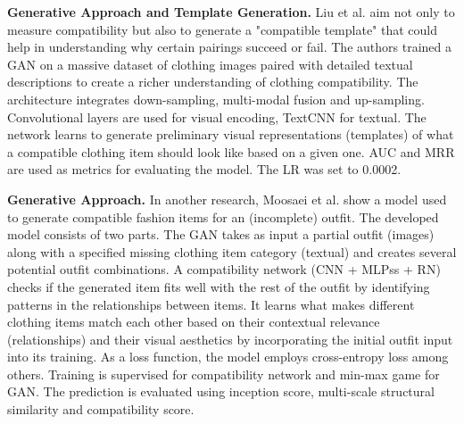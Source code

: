 \vspace{5mm}

\textbf{Generative Approach and Template Generation.}
Liu et al. aim not only to measure compatibility but also to generate a "compatible template" that could help in understanding why certain pairings succeed or fail. The authors trained a \acs{GAN} on a massive dataset of clothing images paired with detailed textual descriptions to create a richer understanding of clothing compatibility. The architecture integrates down-sampling, multi-modal fusion and up-sampling. Convolutional layers are used for visual encoding, TextCNN for textual. The network learns to generate preliminary visual representations (templates) of what a compatible clothing item should look like based on a given one. \acs{AUC} and \acs{MRR} are used as metrics for evaluating the model. The \acs{LR} was set to 0.0002. \cite[vgl.]{liu_mgcm_2020}

\vspace{5mm}

\textbf{Generative Approach.}
In another research, Moosaei et al. show a model used to generate compatible fashion items for an (incomplete) outfit. The developed model consists of two parts. The \acs{GAN} takes as input a partial outfit (images) along with a specified missing clothing item category (textual) and creates several potential outfit combinations. A compatibility network (\acs{CNN} + \acsp{MLPs} + \acs{RN}) checks if the generated item fits well with the rest of the outfit by identifying patterns in the relationships between items. It learns what makes different clothing items match each other based on their contextual relevance (relationships) and their visual aesthetics by incorporating the initial outfit input into its training. As a loss function, the model employs cross-entropy loss among others. Training is supervised for compatibility network and min-max game for \acs{GAN}. The prediction is evaluated using inception score, multi-scale structural similarity and compatibility score. \cite[vgl.]{moosaei_outfitgan_2022}

\vspace{5mm}

